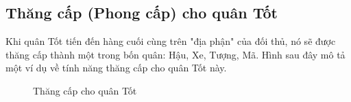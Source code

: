 \subsection{Thăng cấp (Phong cấp) cho quân Tốt}
Khi quân Tốt tiến đến hàng cuối cùng trên "địa phận" của đối thủ, nó sẽ được thăng cấp thành một trong bốn quân: Hậu, Xe, Tượng, Mã. Hình sau đây mô tả một ví dụ về tính năng thăng cấp cho quân Tốt này.
\begin{figure}[H]
\caption{Thăng cấp cho quân Tốt}
\end{figure}

